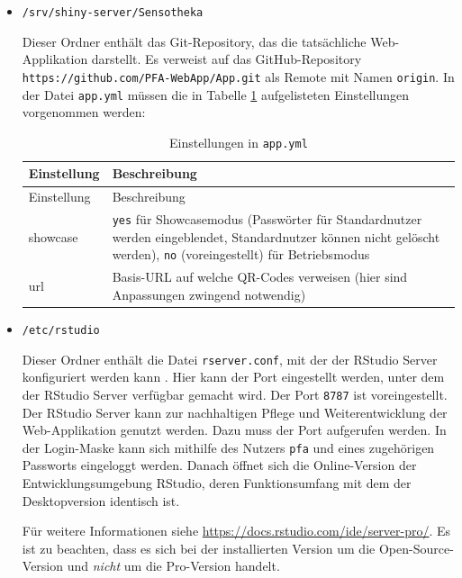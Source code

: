 \documentclass[
]{article}
\begin{document}
\begin{itemize}
\item
  \texttt{/srv/shiny-server/Sensotheka}

  Dieser Ordner enthält das Git-Repository, das die tatsächliche Web-Applikation darstellt. Es verweist auf das GitHub-Repository \texttt{https://github.com/PFA-WebApp/App.git} als Remote mit Namen \texttt{origin}. In der Datei \texttt{app.yml} müssen die in Tabelle \ref{tab:app-yml} aufgelisteten Einstellungen vorgenommen werden:

  \begin{longtable}[]{@{}
    >{\raggedright\arraybackslash}p{}
    >{\raggedright\arraybackslash}p{}@{}}
  \caption{\label{tab:app-yml} Einstellungen in \texttt{app.yml}}\tabularnewline
  \toprule
  Einstellung & Beschreibung \\
  \midrule
  \endfirsthead
  \toprule
  Einstellung & Beschreibung \\
  \midrule
  \endhead
  showcase & \texttt{yes} für Showcasemodus (Passwörter für Standardnutzer werden eingeblendet, Standardnutzer können nicht gelöscht werden), \texttt{no} (voreingestellt) für Betriebsmodus \\
  url & Basis-URL auf welche QR-Codes verweisen (hier sind Anpassungen zwingend notwendig) \\
  \bottomrule
  \end{longtable}
\end{itemize}

\begin{itemize}
\item
  \texttt{/etc/rstudio}

  Dieser Ordner enthält die Datei \texttt{rserver.conf}, mit der der RStudio Server konfiguriert werden kann \autocite{rstudio-server}. Hier kann der Port eingestellt werden, unter dem der RStudio Server verfügbar gemacht wird. Der Port \texttt{8787} ist voreingestellt. Der RStudio Server kann zur nachhaltigen Pflege und Weiterentwicklung der Web-Applikation genutzt werden. Dazu muss der Port aufgerufen werden. In der Login-Maske kann sich mithilfe des Nutzers \texttt{pfa} und eines zugehörigen Passworts eingeloggt werden. Danach öffnet sich die Online-Version der Entwicklungsumgebung RStudio, deren Funktionsumfang mit dem der Desktopversion identisch ist.

  Für weitere Informationen siehe \url{https://docs.rstudio.com/ide/server-pro/}. Es ist zu beachten, dass es sich bei der installierten Version um die Open-Source-Version und \emph{nicht} um die Pro-Version handelt.
\end{itemize}
\end{document}
